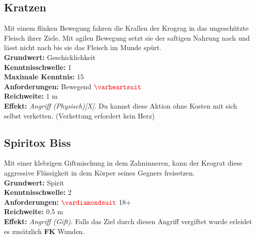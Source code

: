 \subsection*{Kratzen} \label{sk:kratzer}
Mit einem flinken Bewegung fahren die Krallen der Krograg in das ungeschützte Fleisch ihrer Ziele. Mit agilen Bewegung setzt sie der saftigen Nahrung nach und lässt nicht nach bis sie das Fleisch im Munde spürt.\\
\textbf{Grundwert:} Geschicklichkeit \\
\textbf{Kenntnisschwelle:} 1 \\
\textbf{Maximale Kenntnis:} 15 \\
\textbf{Anforderungen:} Bewegend $\Herz{}$ \\
\textbf{Reichweite:} 1 m \\
\textbf{Effekt:} \textit{Angriff (Physisch)[X]}. Du kannst diese Aktion ohne Kosten mit sich selbst verketten. (Verkettung erfordert kein Herz)

\subsection*{Spiritox Biss} \label{sk:spiritox_biss}
Mit einer klebrigen Giftmischung in dem Zahninneren, kann der Krograt diese aggressive Flüssigkeit in dem Körper seines Gegners freisetzen.\\
\textbf{Grundwert:} Spirit \\
\textbf{Kenntnisschwelle:} 2 \\
\textbf{Anforderungen:} $\Karo{}$ 18+ \\
\textbf{Reichweite:} 0.5 m \\
\textbf{Effekt:} \textit{Angriff (Gift)}. Falls das Ziel durch diesen Angriff vergiftet wurde erleidet es zusätzlich \textbf{FK} Wunden.


